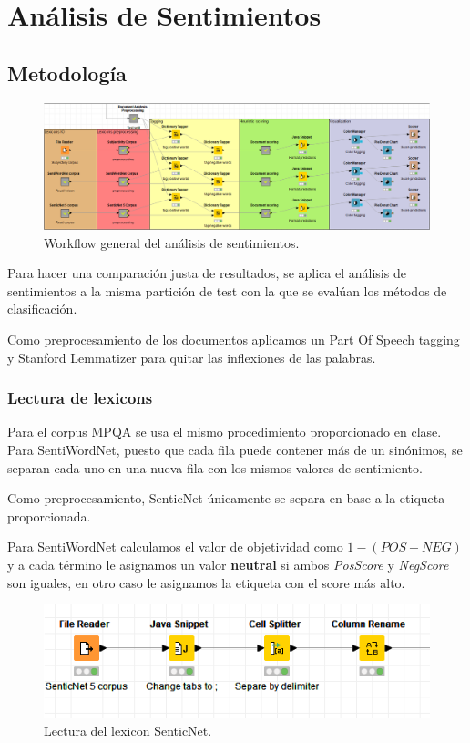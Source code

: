 \section{Análisis de Sentimientos}

\subsection{Metodología}

\begin{figure}[t]
    \center\includegraphics[width=.95\linewidth]{img/analysis/workflow.png}
    \caption{Workflow general del análisis de sentimientos.}
\end{figure}

Para hacer una comparación justa de resultados, se aplica el análisis de sentimientos a la misma partición de test con la que se evalúan los métodos de clasificación.

Como preprocesamiento de los documentos aplicamos un Part Of Speech tagging y Stanford Lemmatizer para quitar las inflexiones de las palabras.

\subsubsection{Lectura de lexicons}

Para el corpus MPQA se usa el mismo procedimiento proporcionado en clase.
Para SentiWordNet, puesto que cada fila puede contener más de un sinónimos, se separan cada uno en una nueva fila con los mismos valores de sentimiento.

Como preprocesamiento, SenticNet únicamente se separa en base a la etiqueta proporcionada.

Para SentiWordNet calculamos el valor de objetividad como $1 - (POS + NEG)$ y a cada término le asignamos un valor \textbf{neutral} si ambos \textit{PosScore} y \textit{NegScore} son iguales, en otro caso le asignamos la etiqueta con el score más alto.

\begin{figure}[t]
    \center\includegraphics[width=.95\linewidth]{img/analysis/senticnet-reading.png}
    \caption{Lectura del lexicon SenticNet.}
\end{figure}

